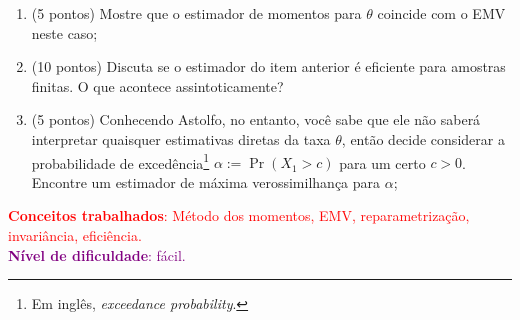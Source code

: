 \documentclass[a4paper,10pt, notitlepage]{report}
\newcommand{\pr}{\operatorname{Pr}} %
\begin{document}
\begin{enumerate}[label=\alph*)]
 \item (5 pontos) Mostre que o estimador de momentos para $\theta$ coincide com o EMV neste caso;
 \item (10 pontos) Discuta se o estimador do item anterior é eficiente para amostras finitas.
 O que acontece assintoticamente?
 \item (5 pontos) Conhecendo Astolfo, no entanto, você sabe que ele não saberá interpretar quaisquer estimativas diretas da taxa $\theta$, então decide considerar a probabilidade de excedência\footnote{Em inglês, \textit{exceedance probability}.} $\alpha := \pr(X_1 > c)$ para um certo $c > 0$.
 Encontre um estimador de máxima verossimilhança para $\alpha$;
\end{enumerate}
\textcolor{red}{\textbf{Conceitos trabalhados}: Método dos momentos, EMV, reparametrização, invariância, eficiência.}
\\
\textcolor{purple}{\textbf{Nível de dificuldade}: fácil.}
\\
\end{document}
